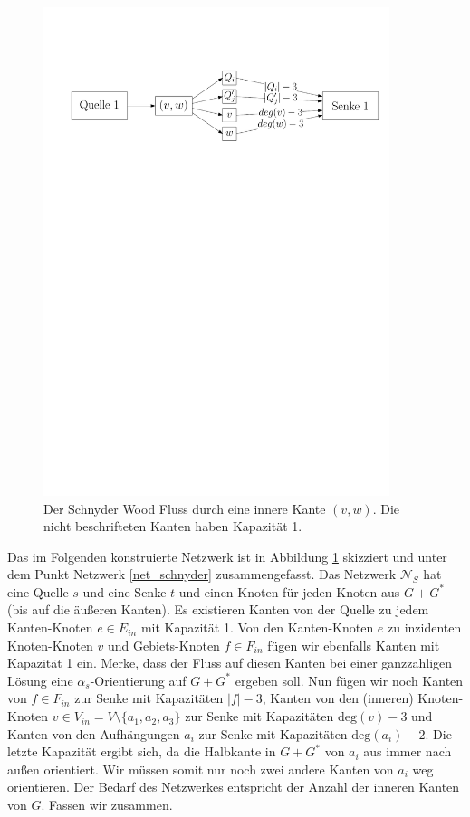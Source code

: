 \begin{figure}
	\centering
  \includegraphics[width=0.9\textwidth]{schnyder_flow.pdf}
  \caption{Der Schnyder Wood Fluss durch eine innere Kante $(v,w)$. Die nicht beschrifteten Kanten haben Kapazität 1.}
  \label{schnyder_flow}
\end{figure}

Das im Folgenden konstruierte Netzwerk ist in Abbildung \ref{schnyder_flow} skizziert und unter dem Punkt Netzwerk \ref{net_schnyder} zusammengefasst. Das Netzwerk $\mathcal{N}_S$ hat eine Quelle $s$ und eine Senke $t$ und einen Knoten für jeden Knoten aus $G+G^*$ (bis auf die äußeren Kanten). Es existieren Kanten von der Quelle zu jedem Kanten-Knoten $e \in E_{in}$ mit Kapazität 1. Von den Kanten-Knoten $e$ zu inzidenten Knoten-Knoten $v$ und Gebiets-Knoten $f \in F_{in}$ fügen wir ebenfalls Kanten mit Kapazität 1 ein. Merke, dass der Fluss auf diesen Kanten bei einer ganzzahligen Lösung eine $\alpha_s$-Orientierung auf $G+G^*$ ergeben soll. Nun fügen wir noch Kanten von $f \in F_{in}$ zur Senke mit Kapazitäten $|f|-3$, Kanten von den (inneren) Knoten-Knoten $v \in V_{in} = V \setminus \{a_1,a_2,a_3\}$ zur Senke mit Kapazitäten $\text{deg}(v)-3$ und Kanten von den Aufhängungen $a_i$ zur Senke mit Kapazitäten $\text{deg}(a_i)-2$. Die letzte Kapazität ergibt sich, da die Halbkante in $G+G^*$ von $a_i$ aus immer nach außen orientiert. Wir müssen somit nur noch zwei andere Kanten von $a_i$ weg orientieren. Der Bedarf des Netzwerkes entspricht der Anzahl der inneren Kanten von $G$. Fassen wir zusammen.

